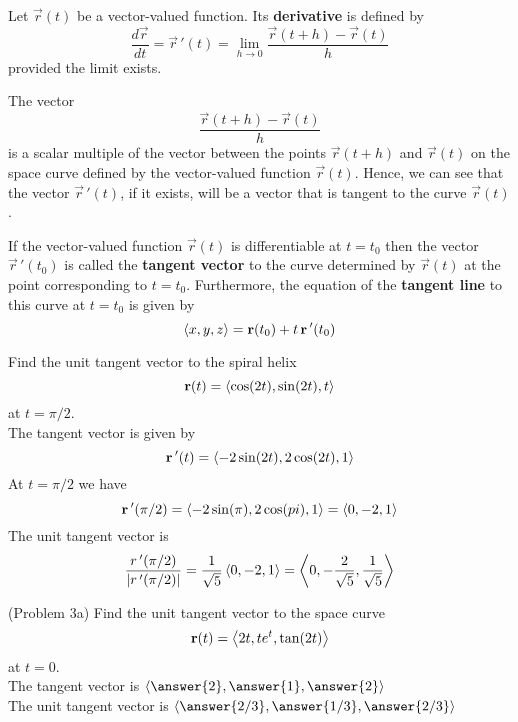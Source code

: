 \documentclass[handout]{ximera}
\begin{document}
\begin{definition}
Let $\vec r(t)$ be a vector-valued function. Its \textbf{derivative} is defined by
\[
\frac{d\vec r}{dt} = \vec r\, '(t) = \lim_{h \to 0} \frac{\vec r(t+h) - \vec r(t)}{h}
\]
provided the limit exists.
\end{definition}

\begin{remark}
The vector 
\[
\frac{\vec r(t+h) - \vec r(t)}{h}
\]
is a scalar multiple of the vector between the points $\vec r(t+h)$ and $\vec r(t)$ on the space 
curve defined by the vector-valued function $\vec r(t)$. 
Hence, we can see that the vector $\vec r\,'(t)$, if it exists, 
will be a vector that is tangent to the curve $\vec r(t)$. 
\end{remark}

\begin{definition}
If the vector-valued function $\vec r(t)$ is differentiable at $t = t_0$ then the vector $\vec r\,'(t_0)$ is called the 
\textbf{tangent vector} to the curve determined by $\vec r(t)$ at the point corresponding to $t = t_0$. 
Furthermore, the equation of the \textbf{tangent line} to this curve at $ t= t_0$ is given by
\[
\left\langle x, y, z\right\rangle = \mathbf r(t_0) + t\,\mathbf r\,'(t_0)
\]
\end{definition}

\begin{example}[Example 3] 
Find the unit tangent vector to the spiral helix
\[
\mathbf r(t) = \left\langle \cos(2t), \sin(2t), t\right\rangle
\]
at $t = \pi/2$.\\
The tangent vector is given by
\[
\mathbf r\,'(t) = \left\langle -2\sin(2t), 2\cos(2t), 1\right\rangle
\]
At $t = \pi/2$ we have
\[
\mathbf r\,'(\pi/2) = \left\langle -2\sin(\pi), 2\cos(pi), 1\right\rangle = \left\langle 0, -2, 1\right\rangle
\]
The unit tangent vector is
\[
\frac{r\,'(\pi/2)}{|r\,'(\pi/2)|} = \frac{1}{\sqrt 5}\left\langle 0, -2, 1\right\rangle = \left\langle 0, -\frac{2}{\sqrt 5}, \frac{1}{\sqrt 5}\right\rangle
\]

\end{example}

\begin{problem}(Problem 3a)
Find the unit tangent vector to the space curve
\[
\mathbf r(t) = \left\langle 2t, te^t, \tan(2t)\right\rangle
\]
at $t = 0$.\\
The tangent vector is $\vector{\answer{2}, \answer{1}, \answer{2}}$\\
The unit tangent vector is $\vector{\answer{2/3}, \answer{1/3}, \answer{2/3}}$
\end{problem}
\end{document}
